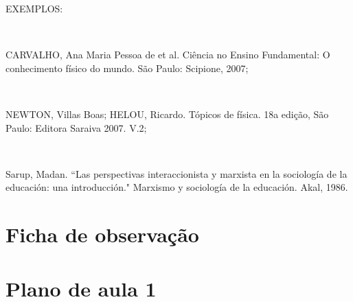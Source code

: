\documentclass[a4paper, 12 pt]{article}                                	%
\begin{document}
	EXEMPLOS:
	
	\
	
	CARVALHO, Ana Maria Pessoa de et al. Ciência no Ensino Fundamental: O conhecimento físico do mundo. São Paulo: Scipione, 2007;
	
	\
	
	NEWTON, Villas Boas; HELOU, Ricardo. Tópicos de física. 18a edição, São Paulo: Editora Saraiva 2007. V.2;
	
	\
	
	Sarup, Madan. ``Las perspectivas interaccionista y marxista en la sociología de la educación: una introducción." Marxismo y sociología de la educación. Akal, 1986.
	
	\newpage
	
	\appendix
	\section{Ficha de observação}  %
	\label{ap:ficha}
	


	\section{Plano de aula 1}
	\label{ap:plano1}  
	
\end{document}
